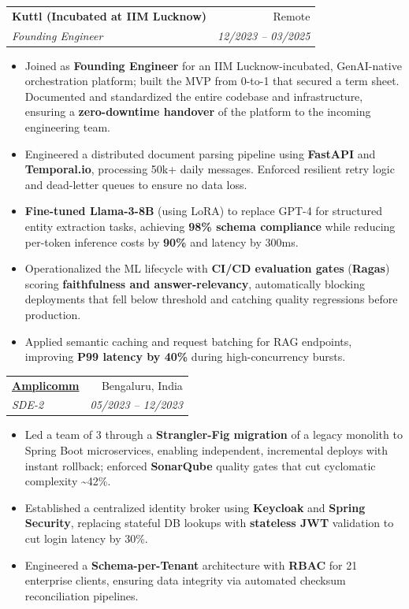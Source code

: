 \documentclass[11pt,a4paper]{article}
\makeatletter
\newcommand{\resumeItem}[1]{
  \item\small{
    {#1 \vspace{-2pt}}
  }
}
\newcommand{\resumeSubheading}[4]{
  \vspace{-1pt}\item
    \begin{tabular*}{0.97\textwidth}[t]{l@{\extracolsep{\fill}}r}
      \textbf{#1} & #2 \\
      \textit{\small#3} & \textit{\small #4} \\
    \end{tabular*}\vspace{-5pt}
}
\newcommand{\resumeItemListStart}{\begin{itemize}[itemsep=2pt, topsep=0pt, partopsep=0pt]}
\newcommand{\resumeItemListEnd}{\end{itemize}\vspace{-5pt}}
\makeatother
\begin{document}
    \resumeSubheading
      {Kuttl (Incubated at IIM Lucknow)}{Remote}
      {Founding Engineer}{12/2023 -- 03/2025}
      \resumeItemListStart
        \resumeItem{Joined as \textbf{Founding Engineer} for an IIM Lucknow-incubated, GenAI-native orchestration platform; built the MVP from 0-to-1 that secured a term sheet. Documented and standardized the entire codebase and infrastructure, ensuring a \textbf{zero-downtime handover} of the platform to the incoming engineering team.}
        \resumeItem{Engineered a distributed document parsing pipeline using \textbf{FastAPI} and \textbf{Temporal.io}, processing 50k+ daily messages. Enforced resilient retry logic and dead-letter queues to ensure no data loss.}
        \resumeItem{\textbf{Fine-tuned Llama-3-8B} (using LoRA) to replace GPT-4 for structured entity extraction tasks, achieving \textbf{98\% schema compliance} while reducing per-token inference costs by \textbf{90\%} and latency by 300ms.}
        \resumeItem{Operationalized the ML lifecycle with \textbf{CI/CD evaluation gates} (\textbf{Ragas}) scoring \textbf{faithfulness and answer-relevancy}, automatically blocking deployments that fell below threshold and catching quality regressions before production.}
        \resumeItem{Applied semantic caching and request batching for RAG endpoints, improving \textbf{P99 latency by 40\%} during high-concurrency bursts.}
      \resumeItemListEnd

    \resumeSubheading
      {\href{https://amplicomm.com/}{Amplicomm}}{Bengaluru, India}
      {SDE-2}{05/2023 -- 12/2023}
      \resumeItemListStart
        \resumeItem{Led a team of 3 through a \textbf{Strangler-Fig migration} of a legacy monolith to Spring Boot microservices, enabling independent, incremental deploys with instant rollback; enforced \textbf{SonarQube} quality gates that cut cyclomatic complexity \textasciitilde{}42\%.}
        \resumeItem{Established a centralized identity broker using \textbf{Keycloak} and \textbf{Spring Security}, replacing stateful DB lookups with \textbf{stateless JWT} validation to cut login latency by 30\%.}
        \resumeItem{Engineered a \textbf{Schema-per-Tenant} architecture with \textbf{RBAC} for 21 enterprise clients, ensuring data integrity via automated checksum reconciliation pipelines.}
      \resumeItemListEnd
\end{document}
